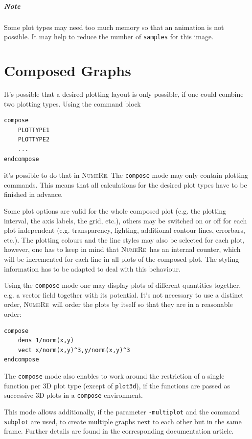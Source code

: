 \documentclass[DIV=14,headsepline,footsepline]{scrbook}
\newcommand{\NR}{\textsc{Nu\-me\-Re}}
\begin{document}
			\paragraph{Note}
				Some plot types may need too much memory so that an animation is not possible. It may help to reduce the number of \lstinline+samples+ for this image.
		\chapter{Composed Graphs}
			It's possible that a desired plotting layout is only possible, if one could combine two plotting types. Using the command block
			\begin{lstlisting}
compose
	PLOTTYPE1
	PLOTTYPE2
	...
endcompose
			\end{lstlisting}
			it's possible to do that in \NR. The \lstinline+compose+ mode may only contain plotting commands. This means that all calculations for the desired plot types have to be finished in advance.
			
			Some plot options are valid for the whole composed plot (e.g. the plotting interval, the axis labels, the grid, etc.), others may be switched on or off for each plot independent (e.g. transparency, lighting, additional contour lines, errorbars, etc.). The plotting colours and the line styles may also be selected for each plot, however, one has to keep in mind that \NR\ has an internal counter, which will be incremented for each line in all plots of the composed plot. The styling information has to be adapted to deal with this behaviour.
			
			Using the \lstinline+compose+ mode one may display plots of different quantities together, e.g. a vector field together with its potential. It's not necessary to use a distinct order, \NR\ will order the plots by itself so that they are in a reasonable order:
			\begin{lstlisting}
compose
	dens 1/norm(x,y)
	vect x/norm(x,y)^3,y/norm(x,y)^3
endcompose
			\end{lstlisting}
			
			The \lstinline+compose+ mode also enables to work around the restriction of a single function per 3D plot type (except of \lstinline+plot3d+), if the functions are passed as successive 3D plots in a \lstinline+compose+ environment.
			
			This mode allows additionally, if the parameter \lstinline+-multiplot+ and the command \lstinline+subplot+ are used, to create multiple graphs next to each other but in the same frame. Further details are found in the corresponding documentation article.
			
\end{document}
